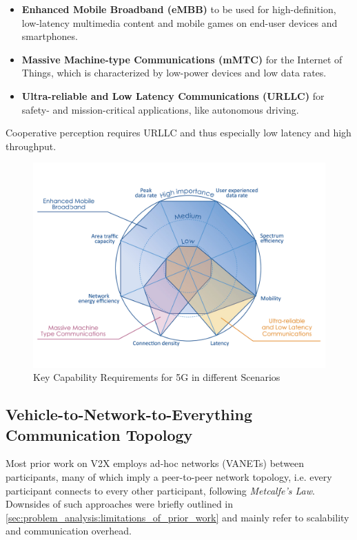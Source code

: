 \begin{itemize}
	\item \textbf{Enhanced Mobile Broadband (eMBB)} to be used for high-definition, low-latency multimedia content and mobile games on end-user devices and smartphones.
	\item \textbf{Massive Machine-type Communications (mMTC)} for the Internet of Things, which is characterized by low-power devices and low data rates.
	\item \textbf{Ultra-reliable and Low Latency Communications (URLLC)} for safety- and mission-critical applications, like autonomous driving. 
\end{itemize}

Cooperative perception requires URLLC and thus especially low latency and high throughput.

\begin{figure}[h]
	\centering
	\includegraphics[width=0.75\linewidth]{98_images/5g_spider_chart}
	\caption[Key Capability Requirements for 5G]{Key Capability Requirements for 5G in different Scenarios \cite{ETSI5G}}
	\label{fig:5g_capabilities}
\end{figure}

\subsection{Vehicle-to-Network-to-Everything Communication Topology}
\label{subsec:concept_design:communication_topology}
Most prior work on V2X employs ad-hoc networks (VANETs) between participants, many of which imply a peer-to-peer network topology, i.e. every participant connects to every other participant, following \textit{Metcalfe's Law}. Downsides of such approaches were briefly outlined in \autoref{sec:problem_analysis:limitations_of_prior_work} and mainly refer to scalability and communication overhead.

